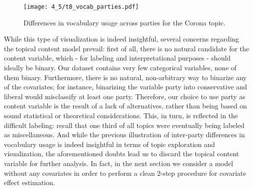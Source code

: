 \documentclass[12pt]{article}
\begin{document}
\begin{figure}[h!]
  \centering
  \captionsetup{justification=centering,margin=2cm}
  \texttt{[image: 4\_5/t8\_vocab\_parties.pdf]}
  \caption{Differences in vocabulary usage across parties for the Corona topic.}
  \label{fig:t8_vocab_parties}
\end{figure}

While this type of visualization is indeed insightful, several concerns regarding the topical content model prevail: first of all, there is no natural candidate for the content variable, which - for labeling and interpretational purposes - should ideally be binary. Our dataset contains very few categorical variables, none of them binary. Furthermore, there is no natural, non-arbitrary way to binarize any of the covariates; for instance, binarizing the variable party into conservative and liberal would misclassify at least one party. Therefore, our choice to use party as content variable is the result of a lack of alternatives, rather than being based on sound statistical or theoretical considerations. This, in turn, is reflected in the difficult labeling: recall that one third of all topics were eventually being labeled as miscellaneous. And while the previous illustration of inter-party differences in vocabulary usage is indeed insightful in terms of topic exploration and visualization, the aforementioned doubts lead us to discard the topical content variable for further analysis. In fact, in the next section we consider a model without any covariates in order to perform a clean 2-step procedure for covariate effect estimation.




\end{document}
